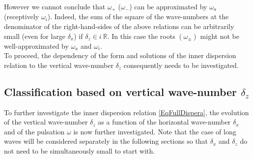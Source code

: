 \documentclass[a4paper,11pt]{article}
\begin{document}
However we cannot conclude that $\omega_+$ ($\omega_-$) can be approximated by $\omega_a$ (receptively $\omega_i$). Indeed, the sum of the square of the wave-numbers at the denominator of the right-hand-sides of the above relations can be arbitrarily small (even for large $\delta_x$) if $\delta_z\in i \ \mathbb{R}$. In this case the roots $(\omega_\pm)$ might not be well-approximated by $\omega_a$ and $\omega_i$.\\
To proceed, the dependency of the form and solutions of the inner dispersion relation to the vertical wave-number $\delta_z$ consequently needs to be investigated. 

\subsection{Classification based on vertical wave-number $\delta_z$}
To further investigate the inner dispersion relation \ref{EqFullDispera}, the evolution of the vertical wave-number $\delta_z$ as a function of the horizontal wave-number $\delta_x$ and of the pulsation $\omega$ is now further investigated. Note that the case of long waves will be considered separately in the following sections so that $\delta_x$ and $\delta_z$ do not need to be simultaneously small to start with.
\end{document}
